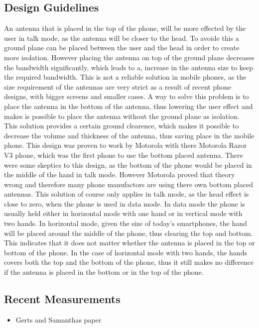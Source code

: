 \subsection{Design Guidelines}
An antenna that is placed in the top of the phone, will be more effected by the user in talk mode, as the antenna will be closer to the head. To avoide this a ground plane can be placed between the user and the head in order to create more isolation. However placing the antenna on top of the ground plane decreases the bandwidth significantly, which leads to a, increase in the antenna size to keep the required bandwidth. This is not a reliable solution in mobile phones, as the size requirement of the antennas are very strict as a result of recent phone designs, with bigger screens and smaller cases. A way to solve this problem is to place the antenna in the bottom of the antenna, thus lowering the user effect and makes is possible to place the antenna without the ground plane as isolation. This solution provides a certain ground clearence, which makes it possible to decrease the volume and thickness of the antenna, thus saving place in the mobile phone. 
This design was proven to work by Motorola with there Motorola Razor V3 phone, which was the first phone to use the bottom placed antenna. There were some skeptics to this design, as the bottom of the phone would be placed in the middle of the hand in talk mode. However Motorola proved that theory wrong and therefore many phone manufactors are using there own bottom placed antennas. This solution of course only applies in talk mode, as the head effect is close to zero, when the phone is used in data mode. In data mode the phone is usually held either in horizontal mode with one hand or in vertical mode with two hands. In horizontal mode, given the size of today's smartphones, the hand will be placed around the middle of the phone, thus clearing the top and bottom. This indicates that it does not matter whether the antenna is placed in the top or bottom of the phone. In the case of horizontal mode with two hands, the hands covers both the top and the bottom of the phone, thus it still makes no difference if the antenna is placed in the bottom or in the top of the phone.   

\subsection{Recent Measurements}

\begin{itemize}
\item Gerts and Samanthas paper
\end{itemize}




 



